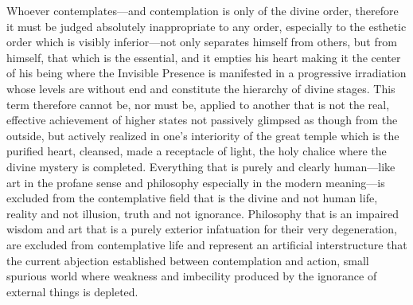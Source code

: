 Whoever contemplates---and contemplation is only of the divine order, therefore it must be judged absolutely inappropriate to any order, especially to the esthetic order which is visibly inferior---not only separates himself from others, but from himself, that which is the essential, and it empties his heart making it the center of his being where the Invisible Presence is manifested in a progressive irradiation whose levels are without end and constitute the hierarchy of divine stages. This term therefore cannot be, nor must be, applied to another that is not the real, effective achievement of higher states not passively glimpsed as though from the outside, but actively realized in one's interiority of the great temple which is the purified heart, cleansed, made a receptacle of light, the holy chalice where the divine mystery is completed. Everything that is purely and clearly human---like art in the profane sense and philosophy especially in the modern meaning---is excluded from the contemplative field that is the divine and not human life, reality and not illusion, truth and not ignorance. Philosophy that is an impaired wisdom and art that is a purely exterior infatuation for their very degeneration, are excluded from contemplative life and represent an artificial interstructure that the current abjection established between contemplation and action, small spurious world where weakness and imbecility produced by the ignorance of external things is depleted.


